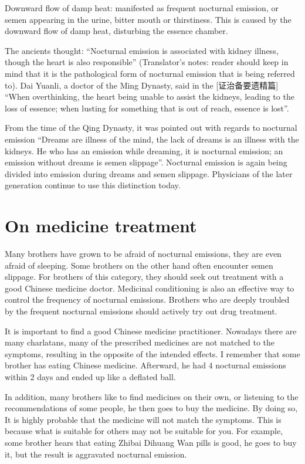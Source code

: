 \documentclass[
]{book}
\begin{document}
Downward flow of damp heat: manifested as frequent nocturnal emission, or semen appearing in the urine, bitter mouth or thirstiness. This is caused by the downward flow of damp heat, disturbing the essence chamber.

The ancients thought: ``Nocturnal emission is associated with kidney illness, though the heart is also responsible'' (Translator's notes: reader should keep in mind that it is the pathological form of nocturnal emission that is being referred to). Dai Yuanli, a doctor of the Ming Dynasty, said in the {[}证治备要遗精篇{]} ``When overthinking, the heart being unable to assist the kidneys, leading to the loss of essence; when lusting for something that is out of reach, essence is lost''.

From the time of the Qing Dynasty, it was pointed out with regards to nocturnal emission ``Dreams are illness of the mind, the lack of dreams is an illness with the kidneys. He who has an emission while dreaming, it is nocturnal emission; an emission without dreams is semen slippage''. Nocturnal emission is again being divided into emission during dreams and semen slippage. Physicians of the later generation continue to use this distinction today.

\hypertarget{on-medicine-treatment}{%
\section{On medicine treatment}\label{on-medicine-treatment}}

Many brothers have grown to be afraid of nocturnal emissions, they are even afraid of sleeping. Some brothers on the other hand often encounter semen slippage. For brothers of this category, they should seek out treatment with a good Chinese medicine doctor. Medicinal conditioning is also an effective way to control the frequency of nocturnal emissions. Brothers who are deeply troubled by the frequent nocturnal emissions should actively try out drug treatment.

It is important to find a good Chinese medicine practitioner. Nowadays there are many charlatans, many of the prescribed medicines are not matched to the symptoms, resulting in the opposite of the intended effects. I remember that some brother has eating Chinese medicine. Afterward, he had 4 nocturnal emissions within 2 days and ended up like a deflated ball.

In addition, many brothers like to find medicines on their own, or listening to the recommendations of some people, he then goes to buy the medicine. By doing so, It is highly probable that the medicine will not match the symptoms. This is because what is suitable for others may not be suitable for you. For example, some brother hears that eating Zhibai Dihuang Wan pills is good, he goes to buy it, but the result is aggravated nocturnal emission.
\end{document}
